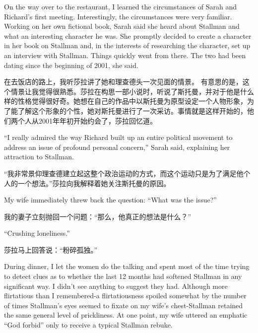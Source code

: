 \ifdefined\eng
On the way over to the restaurant, I learned the circumstances of Sarah and Richard's first meeting. Interestingly, the circumstances were very familiar. Working on her own fictional book, Sarah said she heard about Stallman and what an interesting character he was. She promptly decided to create a character in her book on Stallman and, in the interests of researching the character, set up an interview with Stallman. Things quickly went from there. The two had been dating since the beginning of 2001, she said.
\fi

\ifdefined\chs
在去饭店的路上，我听莎拉讲了她和理查德头一次见面的情景。 有意思的是，这个情景让我觉得很熟悉。莎拉在构思一部小说时，听说了斯托曼，并对于他是什么样的性格觉得很好奇。她想在自己的作品中以斯托曼为原型设定一个人物形象，为了能了解这个形象的个性，她对斯托曼进行了一次采访。事情就是这样开始的，他们两个人从2001年年初开始约会了，莎拉回忆道。
\fi

\ifdefined\eng
``I really admired the way Richard built up an entire political movement to address an issue of profound personal concern,'' Sarah said, explaining her attraction to Stallman.
\fi

\ifdefined\chs
``我非常景仰理查德建立起这整个政治运动的方式，而这个运动只是为了满足他个人的一个想法。''莎拉向我解释着她关注斯托曼的原因。
\fi

\ifdefined\eng
My wife immediately threw back the question: ``What was the issue?''
\fi

\ifdefined\chs
我的妻子立刻抛回一个问题：``那么，他真正的想法是什么？''
\fi

\ifdefined\eng
``Crushing loneliness.''
\fi

\ifdefined\chs
莎拉马上回答说：``粉碎孤独。''
\fi

\ifdefined\eng
During dinner, I let the women do the talking and spent most of the time trying to detect clues as to whether the last 12 months had softened Stallman in any significant way. I didn't see anything to suggest they had. Although more flirtatious than I remembered-a flirtatiousness spoiled somewhat by the number of times Stallman's eyes seemed to fixate on my wife's chest-Stallman retained the same general level of prickliness. At one point, my wife uttered an emphatic ``God forbid'' only to receive a typical Stallman rebuke.
\fi

